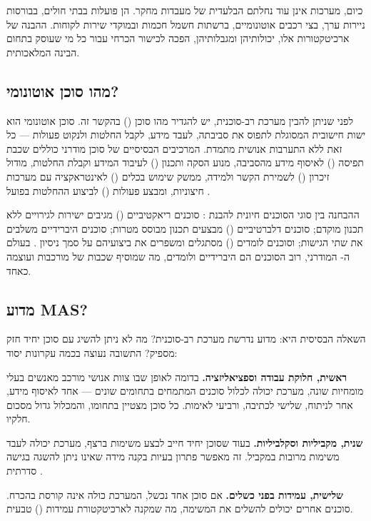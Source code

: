 \documentclass[12pt,a4paper]{article}
\begin{document}
כיום, מערכות  אינן עוד נחלתם הבלעדית של מעבדות מחקר. הן פועלות בבתי חולים, בבורסות ניירות ערך, בצי רכבים אוטונומיים, ברשתות חשמל חכמות ובמוקדי שירות לקוחות. ההבנה של ארכיטקטורות אלו, יכולותיהן ומגבלותיהן, הפכה לכישור הכרחי עבור כל מי שעוסק בתחום הבינה המלאכותית.

\subsection{מהו סוכן אוטונומי?}

לפני שניתן להבין מערכת רב-סוכנית, יש להגדיר מהו סוכן () בהקשר זה. סוכן אוטונומי הוא ישות חישובית המסוגלת לתפוס את סביבתה, לעבד מידע, לקבל החלטות ולנקוט פעולות --- כל זאת ללא התערבות אנושית מתמדת. המרכיבים הבסיסיים של סוכן מודרני כוללים שכבת תפיסה () לאיסוף מידע מהסביבה, מנוע הסקה ותכנון () לעיבוד המידע וקבלת החלטות, מודול זיכרון () לשמירת הקשר ולמידה, ממשק שימוש בכלים () לאינטראקציה עם מערכות חיצוניות, ומבצע פעולות () לביצוע ההחלטות בפועל \cite{arXiv2503}.

ההבחנה בין סוגי הסוכנים חיונית להבנת : סוכנים ריאקטיביים () מגיבים ישירות לגירויים ללא תכנון מוקדם; סוכנים דלברטיביים () מבצעים תכנון מבוסס מטרות; סוכנים היברידיים משלבים את שתי הגישות; וסוכנים לומדים () מסתגלים ומשפרים את ביצועיהם על סמך ניסיון \cite{IBM2024}. בעולם ה- המודרני, רוב הסוכנים הם היברידיים ולומדים, מה שמוסיף שכבות של מורכבות ועוצמה כאחד.

\subsection{מדוע MAS?}

השאלה הבסיסית היא: מדוע נדרשת מערכת רב-סוכנית? מה לא ניתן להשיג עם סוכן יחיד חזק מספיק? התשובה נעוצה בכמה עקרונות יסוד:

\textbf{ראשית, חלוקת עבודה וספציאליזציה.} בדומה לאופן שבו צוות אנושי מורכב מאנשים בעלי מומחיות שונה, מערכת  יכולה לכלול סוכנים המתמחים בתחומים שונים --- אחד לאיסוף מידע, אחר לניתוח, שלישי לכתיבה, ורביעי לאימות. כל סוכן מצטיין בתחומו, והמכלול גדול מסכום חלקיו.

\textbf{שנית, מקביליות וסקלביליות.} בעוד שסוכן יחיד חייב לבצע משימות ברצף, מערכת  יכולה לעבד משימות מרובות במקביל. זה מאפשר פתרון בעיות בקנה מידה שאינו ניתן להשגה בגישה סדרתית \cite{arXiv2402}.

\textbf{שלישית, עמידות בפני כשלים.} אם סוכן אחד נכשל, המערכת כולה אינה קורסת בהכרח. סוכנים אחרים יכולים להשלים את המשימה, מה שמקנה לארכיטקטורת  עמידות () טבעית.
\end{document}
